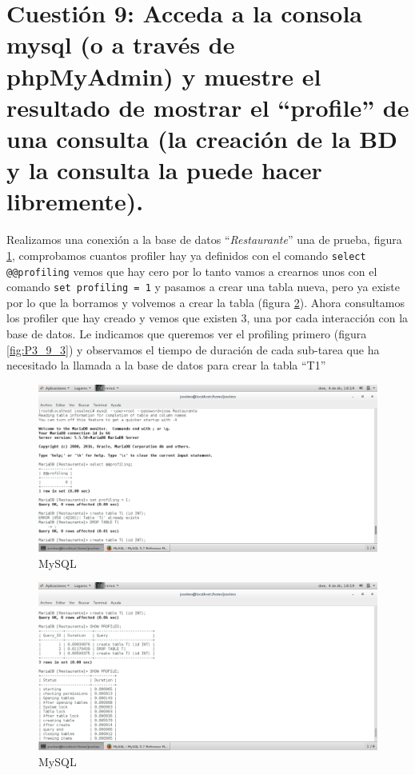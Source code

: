 
\section{Cuestión 9: Acceda a la consola mysql (o a través de phpMyAdmin) y
muestre el resultado de mostrar el ``profile'' de una consulta (la creación de
la BD y la consulta la puede hacer libremente).}
Realizamos una conexión a la base de datos ``\textit{Restaurante}'' una de prueba, 
figura \ref{fig:P3_9_1}, comprobamos cuantos profiler hay ya definidos con el comando 
\texttt{select @@profiling} vemos que hay cero por lo tanto vamos a crearnos unos con
 el comando \texttt{set profiling = 1} y pasamos a crear una tabla nueva, pero ya existe
 por lo que la borramos y volvemos a crear la tabla (figura \ref{fig:P3_9_2}). Ahora consultamos
 los profiler que hay creado y vemos que existen 3, una por cada interacción con la base de datos.
Le indicamos que queremos ver el profiling primero (figura \ref{fig:P3_9_3}) y observamos el tiempo
de duración de cada sub-tarea que ha necesitado la llamada a la base de datos para crear la tabla ``T1''  


\begin{figure}[H] %
\centering
\includegraphics[scale=0.4]{./imagenes/P3_9_1.png} 
\caption{MySQL } \label{fig:P3_9_1}
\end{figure}

\begin{figure}[H] %
\centering
\includegraphics[scale=0.4]{./imagenes/P3_9_2.png} 
\caption{MySQL } \label{fig:P3_9_2}
\end{figure}

